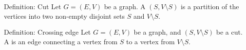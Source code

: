 \documentclass[a4paper]{article}
\begin{document}
\begin{parag}{Definition: Cut}
    Let $G = \left(E, V\right)$ be a graph. A  $\left(S, V \setminus S\right)$ is a partition of the vertices into two non-empty disjoint sets $S$ and $V \setminus S$.
\end{parag}

\begin{parag}{Definition: Crossing edge}
    Let $G = \left(E, V\right)$ be a graph, and $\left(S, V \setminus S\right)$ be a cut. A  is an edge connecting a vertex from $S$ to a vertex from $V \setminus S$.
\end{parag}
\end{document}
